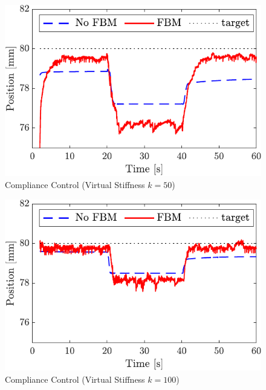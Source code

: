 \begin{figure}[t]
    \centering
        \includegraphics[keepaspectratio, scale=1.0]{contents/IntegrationControl/figure/compra/compra_k50-crop.pdf}
        \caption{Compliance Control (Virtual Stiffness $k=50$)}
        \label{fig:compra_k50-crop}
\end{figure}
\begin{figure}[t]
    \centering
        \includegraphics[keepaspectratio, scale=1.0]{contents/IntegrationControl/figure/compra/compra_k100-crop.pdf}
        \caption{Compliance Control (Virtual Stiffness $k=100$)}
        \label{fig:compra_k100-crop}
\end{figure}


